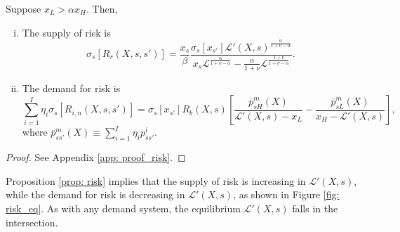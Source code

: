 \begin{proposition} \label{prop: risk} Suppose $x_L > \alpha x_H $. Then,
\begin{enumerate}[(i)]
    \item The supply of risk is
    \begin{equation}
        \sigma_s[R_r(X,s,s')] = \frac{x_s}{\beta} \frac{\sigma_s[x_{s'}] \mathcal{L}'(X,s)^\frac{\alpha}{1+\nu-\alpha}}{x_{s} \mathcal{L}^\frac{\alpha}{1+\nu-\alpha} - \frac{\alpha}{1+\nu} \mathcal{L}^{\frac{1+\nu}{1+\nu-\alpha}} }.
    \end{equation}
    
    \item The demand for risk is
    \begin{equation}
        \sum_{i=1}^I \eta_i \sigma_s[R_{i,n}(X,s,s')] =  \sigma_s[x_{s'}] R_b(X,s) \left[\frac{\overline{p}^m_{sH}(X)}{\mathcal{L}'(X,s) - x_L}  -\frac{\overline{p}^m_{sL}(X)}{x_H-\mathcal{L}'(X,s)} \right],
    \end{equation}
    where $\overline{p}_{ss'}^{m}(X) \equiv \sum_{i=1}^I \eta_i p_{ss'}^i$.
\end{enumerate}

\end{proposition}
\begin{proof}
See Appendix \ref{app: proof_risk}.
\end{proof}
Proposition \ref{prop: risk} implies that the supply of risk is increasing in $\mathcal{L}'(X,s)$, while the demand for risk is decreasing in $\mathcal{L}'(X,s)$, as shown in Figure \ref{fig: risk_eq}. As with any demand system, the equilibrium $\mathcal{L}'(X,s)$ falls in the intersection. 

